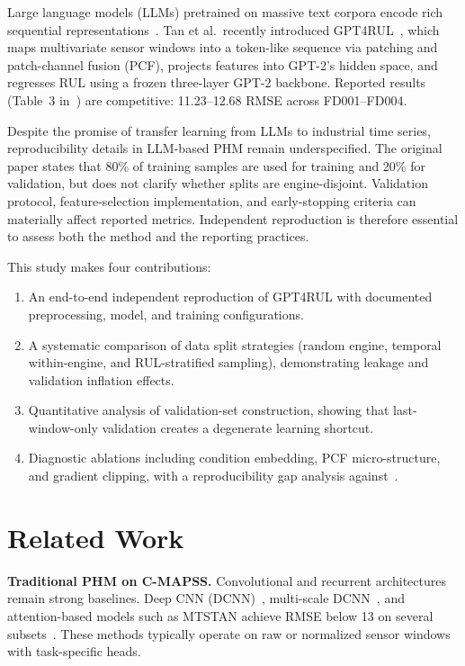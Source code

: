 \documentclass[10pt,twocolumn]{article}
\begin{document}
Large language models (LLMs) pretrained on massive text corpora encode rich sequential representations~\cite{radford2019}.
Tan et al.\ recently introduced GPT4RUL~\cite{tan2025}, which maps multivariate sensor windows into a token-like sequence via patching and patch-channel fusion (PCF), projects features into GPT-2's hidden space, and regresses RUL using a frozen three-layer GPT-2 backbone.
Reported results (Table~3 in~\cite{tan2025}) are competitive: 11.23--12.68 RMSE across FD001--FD004.

Despite the promise of transfer learning from LLMs to industrial time series, reproducibility details in LLM-based PHM remain underspecified.
The original paper states that 80\% of training samples are used for training and 20\% for validation, but does not clarify whether splits are engine-disjoint.
Validation protocol, feature-selection implementation, and early-stopping criteria can materially affect reported metrics.
Independent reproduction is therefore essential to assess both the method and the reporting practices.

This study makes four contributions:
\begin{enumerate}
  \item An end-to-end independent reproduction of GPT4RUL with documented preprocessing, model, and training configurations.
  \item A systematic comparison of data split strategies (random engine, temporal within-engine, and RUL-stratified sampling), demonstrating leakage and validation inflation effects.
  \item Quantitative analysis of validation-set construction, showing that last-window-only validation creates a degenerate learning shortcut.
  \item Diagnostic ablations including condition embedding, PCF micro-structure, and gradient clipping, with a reproducibility gap analysis against~\cite{tan2025}.
\end{enumerate}

\section{Related Work}

\textbf{Traditional PHM on C-MAPSS.}
Convolutional and recurrent architectures remain strong baselines.
Deep CNN (DCNN)~\cite{li2018}, multi-scale DCNN~\cite{li2020}, and attention-based models such as MTSTAN achieve RMSE below 13 on several subsets~\cite{tan2025}.
These methods typically operate on raw or normalized sensor windows with task-specific heads.
\end{document}
